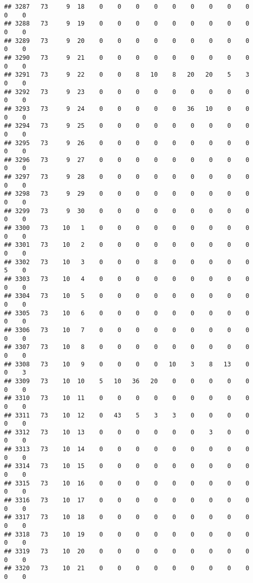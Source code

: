 \documentclass[]{article}
\begin{document}
\begin{verbatim}
## 3287   73     9  18    0    0    0    0    0    0    0    0    0    0    0
## 3288   73     9  19    0    0    0    0    0    0    0    0    0    0    0
## 3289   73     9  20    0    0    0    0    0    0    0    0    0    0    0
## 3290   73     9  21    0    0    0    0    0    0    0    0    0    0    0
## 3291   73     9  22    0    0    8   10    8   20   20    5    3    0    0
## 3292   73     9  23    0    0    0    0    0    0    0    0    0    0    0
## 3293   73     9  24    0    0    0    0    0   36   10    0    0    0    0
## 3294   73     9  25    0    0    0    0    0    0    0    0    0    0    0
## 3295   73     9  26    0    0    0    0    0    0    0    0    0    0    0
## 3296   73     9  27    0    0    0    0    0    0    0    0    0    0    0
## 3297   73     9  28    0    0    0    0    0    0    0    0    0    0    0
## 3298   73     9  29    0    0    0    0    0    0    0    0    0    0    0
## 3299   73     9  30    0    0    0    0    0    0    0    0    0    0    0
## 3300   73    10   1    0    0    0    0    0    0    0    0    0    0    0
## 3301   73    10   2    0    0    0    0    0    0    0    0    0    0    0
## 3302   73    10   3    0    0    0    8    0    0    0    0    0    5    0
## 3303   73    10   4    0    0    0    0    0    0    0    0    0    0    0
## 3304   73    10   5    0    0    0    0    0    0    0    0    0    0    0
## 3305   73    10   6    0    0    0    0    0    0    0    0    0    0    0
## 3306   73    10   7    0    0    0    0    0    0    0    0    0    0    0
## 3307   73    10   8    0    0    0    0    0    0    0    0    0    0    0
## 3308   73    10   9    0    0    0    0   10    3    8   13    0    0    3
## 3309   73    10  10    5   10   36   20    0    0    0    0    0    0    0
## 3310   73    10  11    0    0    0    0    0    0    0    0    0    0    0
## 3311   73    10  12    0   43    5    3    3    0    0    0    0    0    0
## 3312   73    10  13    0    0    0    0    0    0    3    0    0    0    0
## 3313   73    10  14    0    0    0    0    0    0    0    0    0    0    0
## 3314   73    10  15    0    0    0    0    0    0    0    0    0    0    0
## 3315   73    10  16    0    0    0    0    0    0    0    0    0    0    0
## 3316   73    10  17    0    0    0    0    0    0    0    0    0    0    0
## 3317   73    10  18    0    0    0    0    0    0    0    0    0    0    0
## 3318   73    10  19    0    0    0    0    0    0    0    0    0    0    0
## 3319   73    10  20    0    0    0    0    0    0    0    0    0    0    0
## 3320   73    10  21    0    0    0    0    0    0    0    0    0    0    0

\end{verbatim}
\end{document}
